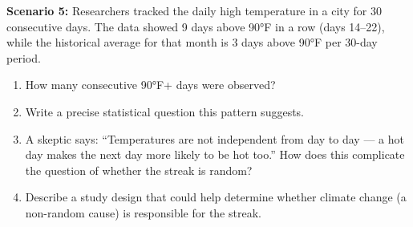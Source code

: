 \documentclass[10pt]{article}
\begin{document}
\vspace{0.1in}

\begin{tcolorbox}[colback=sky, colframe=navy, boxrule=1pt, arc=2mm,
    left=4mm, right=4mm, top=3mm, bottom=3mm,
    title={\bfseries Tier E \enspace Extension --- Deeper Analysis}]
\small

\textbf{Scenario 5:} Researchers tracked the daily high temperature in a city for
30 consecutive days. The data showed 9 days above 90°F in a row (days 14--22), while
the historical average for that month is 3 days above 90°F per 30-day period.

\begin{enumerate}[leftmargin=1.5em, itemsep=8pt]
  \item How many consecutive 90°F+ days were observed? \blank{3cm}
  \item Write a precise statistical question this pattern suggests.\\
        \writeline\writeline
  \item A skeptic says: ``Temperatures are not independent from day to day --- a hot
        day makes the next day more likely to be hot too.'' How does this complicate
        the question of whether the streak is random?\\
        \writeline\writeline\writeline
  \item Describe a study design that could help determine whether climate change (a
        non-random cause) is responsible for the streak.\\
        \writeline\writeline\writeline
\end{enumerate}

\end{tcolorbox}
\end{document}
